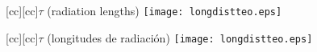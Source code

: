 \documentclass{article}
\begin{document}
\begin{figure}[htbp]
  \begin{center} 
    [cc][cc]{$\tau$ (radiation lengths)}
    \texttt{[image: longdistteo.eps]}
  \end{center}
\end{figure}

\begin{figure}[htbp]
  \begin{center}
    [cc][cc]{$\tau$ (longitudes de radiaci{\'o}n)}
    \texttt{[image: longdistteo.eps]}
  \end{center}
\end{figure}
\end{document}
